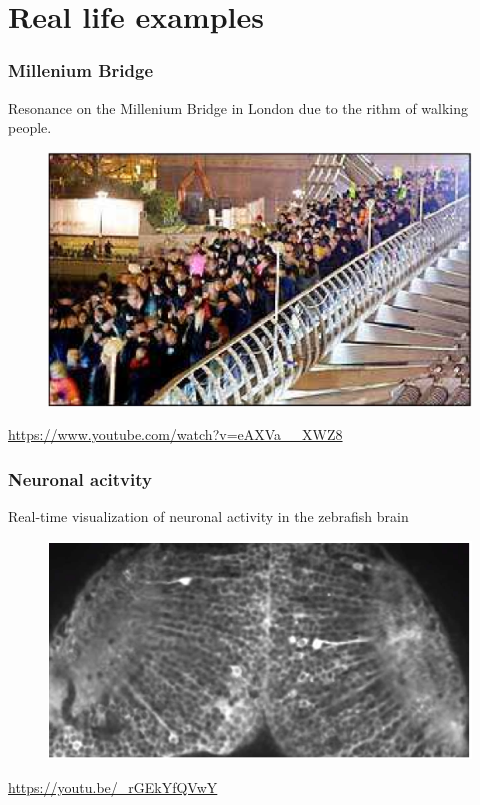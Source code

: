 \documentclass{beamer}
\begin{document}
\section{Real life examples} 

\begin{frame}
\frametitle{Millenium Bridge}
Resonance on the Millenium Bridge in London due to the rithm of walking people.
\begin{figure}
\includegraphics[scale=0.4]{millenium_bridge}
\end{figure}
\url{https://www.youtube.com/watch?v=eAXVa__XWZ8}
\end{frame}


\begin{frame}
\frametitle{Neuronal acitvity}
Real-time visualization of neuronal activity in the zebrafish brain
\begin{figure}
\includegraphics[scale=0.8]{neuronal_activity}
\end{figure}
\url{https://youtu.be/_rGEkYfQVwY}
\end{frame}
\end{document}

